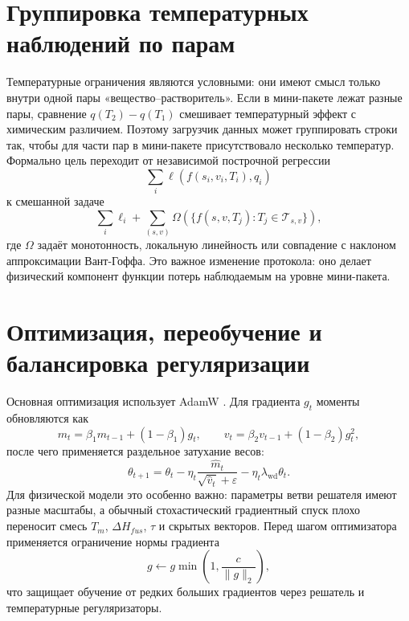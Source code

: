 \documentclass[11pt]{article}
\theoremstyle{definition}
\begin{document}
\section{Группировка температурных наблюдений по парам}
\label{app:pair-aware-batching}

Температурные ограничения являются условными: они имеют смысл только внутри одной пары «вещество--растворитель». Если в мини-пакете лежат разные пары, сравнение $q(T_2)-q(T_1)$ смешивает температурный эффект с химическим различием. Поэтому загрузчик данных может группировать строки так, чтобы для части пар в мини-пакете присутствовало несколько температур. Формально цель переходит от независимой построчной регрессии
\begin{equation*}
    \sum_i \ell(f(s_i,v_i,T_i),q_i)
\end{equation*}
к смешанной задаче
\begin{equation*}
    \sum_i \ell_i
    +
    \sum_{(s,v)}
    \Omega\left(\{f(s,v,T_j):T_j\in\mathcal T_{s,v}\}\right),
\end{equation*}
где $\Omega$ задаёт монотонность, локальную линейность или совпадение с наклоном аппроксимации Вант-Гоффа. Это важное изменение протокола: оно делает физический компонент функции потерь наблюдаемым на уровне мини-пакета.

\section{Оптимизация, переобучение и балансировка регуляризации}
\label{app:optimization}

Основная оптимизация использует AdamW \cite{kingma2015,loshchilov2019}. Для градиента $g_t$ моменты обновляются как
\begin{equation*}
    m_t=\beta_1m_{t-1}+(1-\beta_1)g_t,
    \qquad
    v_t=\beta_2v_{t-1}+(1-\beta_2)g_t^2,
\end{equation*}
после чего применяется раздельное затухание весов:
\begin{equation*}
    \theta_{t+1}
    =\theta_t
    -\eta_t\frac{\hat m_t}{\sqrt{\hat v_t}+\varepsilon}
    -\eta_t\lambda_{\mathrm{wd}}\theta_t .
\end{equation*}
Для физической модели это особенно важно: параметры ветви решателя имеют разные масштабы, а обычный стохастический градиентный спуск плохо переносит смесь $T_m$, $\Delta H_{fus}$, $\tau$ и скрытых векторов. Перед шагом оптимизатора применяется ограничение нормы градиента
\begin{equation*}
    g\leftarrow g\min\left(1,\frac{c}{\|g\|_2}\right),
\end{equation*}
что защищает обучение от редких больших градиентов через решатель и температурные регуляризаторы.
\end{document}
